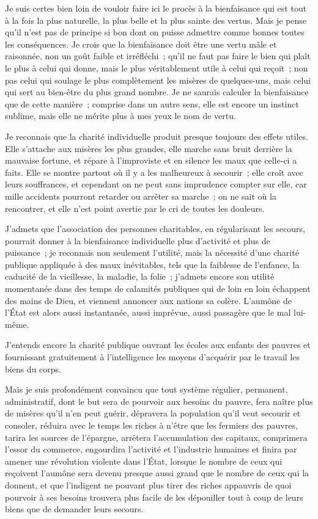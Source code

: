 \documentclass[twoside]{book} %
\begin{document}
\bigbreak
\noindent Je suis certes bien loin de vouloir faire ici le procès à la bienfaisance qui est tout à la fois la plus naturelle, la plus belle et la plus sainte des vertus. Mais je pense qu’il n’est pas de principe si bon dont on puisse admettre comme bonnes toutes les conséquences. Je crois que la bienfaisance doit être une vertu mâle et raisonnée, non un goût faible et irréfléchi ; qu’il ne faut pas faire le bien qui plaît le plus à celui qui donne, mais le plus véritablement utile à celui qui reçoit ; non pas celui qui soulage le plus complètement les misères de quelques-uns, mais celui qui sert au bien-être du plus grand nombre. Je ne saurais calculer la bienfaisance que de cette manière ; comprise dans un autre sens, elle est encore un instinct sublime, mais elle ne mérite plus à mes yeux le nom de vertu.\par
Je reconnais que la charité individuelle produit presque toujours des effets utiles. Elle s’attache aux misères les plus grandes, elle marche sans bruit derrière la mauvaise fortune, et répare à l’improviste et en silence les maux que celle-ci a faits. Elle se montre partout où il y a les malheureux à secourir ; elle croît avec leurs souffrances, et cependant on ne peut sans imprudence compter sur elle, car mille accidents pourront retarder ou arrêter sa marche ; on ne sait où la rencontrer, et elle n’est point avertie par le cri de toutes les douleurs.\par
J'admets que l’association des personnes charitables, en régularisant les secours, pourrait donner à la bienfaisance individuelle plus d’activité et plus de puissance ; je reconnais non seulement l’utilité, mais la nécessité d’une charité publique appliquée à des maux inévitables, tels que la faiblesse de l’enfance, la caducité de la vieillesse, la maladie, la folie ; j’admets encore son utilité momentanée dans des temps de calamités publiques qui de loin en loin échappent des mains de Dieu, et viennent annoncer aux nations sa colère. L'aumône de l’État est alors aussi instantanée, aussi imprévue, aussi passagère que le mal lui-même.\par
J'entends encore la charité publique ouvrant les écoles aux enfants des pauvres et fournissant gratuitement à l’intelligence les moyens d’acquérir par le travail les biens du corps.\par
\bigbreak
\noindent Mais je suis profondément convaincu que tout système régulier, permanent, administratif, dont le but sera de pourvoir aux besoins du pauvre, fera naître plus de misères qu’il n’en peut guérir, dépravera la population qu’il veut secourir et consoler, réduira avec le temps les riches à n’être que les fermiers des pauvres, tarira les sources de l’épargne, arrêtera l’accumulation des capitaux, comprimera l’essor du commerce, engourdira l’activité et l’industrie humaines et finira par amener une révolution violente dans l’État, lorsque le nombre de ceux qui reçoivent l’aumône sera devenu presque aussi grand que le nombre de ceux qui la donnent, et que l’indigent ne pouvant plus tirer des riches appauvris de quoi pourvoir à ses besoins trouvera plus facile de les dépouiller tout à coup de leurs biens que de demander leurs secours.\par
\end{document}
